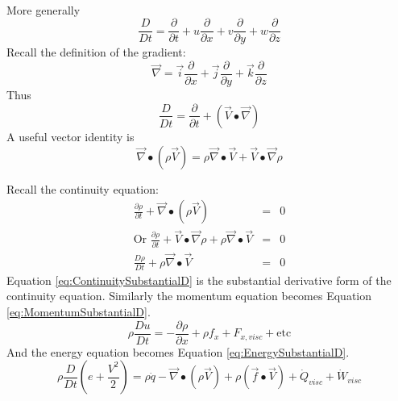 \documentclass[draft=false, titlepage]{article}
\newcommand{\gradient}{\vec{\nabla}}
\newcommand{\deldelt}{\frac{\partial}{\partial t}}
\begin{document}
\paragraph*{} More generally
\begin{equation*}
    \frac{D}{Dt} = \deldelt + u\frac{\partial}{\partial x} + v \frac{\partial}{\partial y} + w\frac{\partial}{\partial z}
\end{equation*}
Recall the definition of the gradient:
\begin{equation}
    \gradient = \vec{i} \frac{\partial}{\partial x} + \vec{j} \frac{\partial}{\partial y} + \vec{k} \frac{\partial}{\partial z}
    \label{eq:Gradient}
\end{equation}
Thus
\begin{equation}
    \frac{D}{Dt} = \deldelt + (\vec{V} \bullet \gradient)
    \label{eq:SubstantialDerivative2}
\end{equation}
A useful vector identity is
\begin{equation*}
    \gradient \bullet (\rho \vec{V}) = \rho \gradient \bullet\vec{V} + \vec{V}\bullet\gradient\rho
\end{equation*}

Recall the continuity equation:
\begin{equation}
    \begin{array}{rcl}
    \frac{\partial \rho}{\partial t} + \gradient \bullet (\rho \vec{V}) &=& 0\\
    \text{Or } \frac{\partial \rho}{\partial t} + \vec{V} \bullet \gradient \rho + \rho \gradient \bullet \vec{V} &=& 0\\
    \frac{D\rho}{Dt} + \rho \gradient \bullet \vec{V} &=& 0
    \end{array}
    \label{eq:ContinuitySubstantialD}
\end{equation}
Equation \ref{eq:ContinuitySubstantialD} is the substantial derivative form of the continuity equation. Similarly the momentum equation becomes Equation \ref{eq:MomentumSubstantialD}.
\begin{equation}
    \rho \frac{Du}{Dt} = -\frac{\partial \rho}{\partial x} + \rho f_x + F_{x,visc} + \text{etc}
    \label{eq:MomentumSubstantialD}
\end{equation}
And the energy equation becomes Equation \ref{eq:EnergySubstantialD}.
\begin{equation}
    \rho \frac{D}{Dt} (e + \frac{V^2}{2}) = \rho \dot{q} - \gradient \bullet (\rho \vec{V}) + \rho (\vec{f} \bullet \vec{V}) + \dot{Q}_{visc} + \dot{W}_{visc}
    \label{eq:EnergySubstantialD}
\end{equation}
\end{document}
